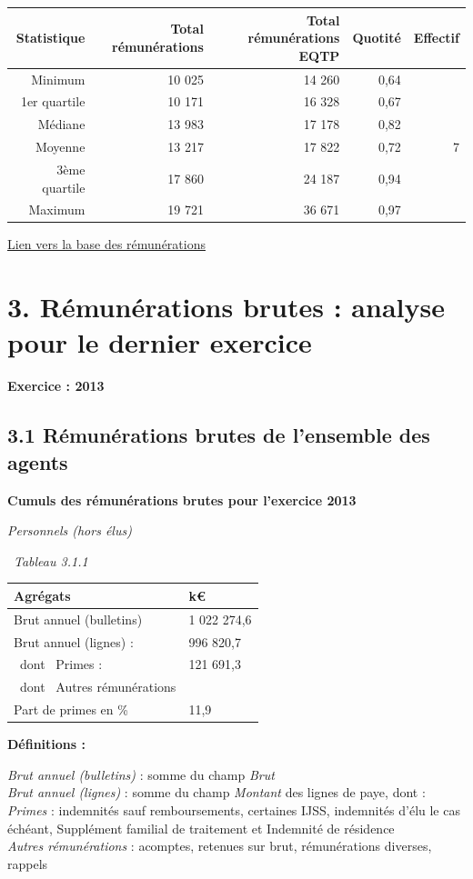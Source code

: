 \begin{longtable}[]{@{}rrrrr@{}}
\toprule
Statistique & Total rémunérations & Total rémunérations EQTP & Quotité &
Effectif\tabularnewline
\midrule
\endhead
Minimum & 10 025 & 14 260 & 0,64 &\tabularnewline
1er quartile & 10 171 & 16 328 & 0,67 &\tabularnewline
Médiane & 13 983 & 17 178 & 0,82 &\tabularnewline
Moyenne & 13 217 & 17 822 & 0,72 & 7\tabularnewline
3ème quartile & 17 860 & 24 187 & 0,94 &\tabularnewline
Maximum & 19 721 & 36 671 & 0,97 &\tabularnewline
\bottomrule
\end{longtable}

\href{../Bases/Remunerations/Analyse.remunerations.csv}{Lien vers la base
des rémunérations}

\newpage

\hypertarget{remunerations-brutes-analyse-pour-le-dernier-exercice}{%
\section{3. Rémunérations brutes : analyse pour le dernier
exercice}\label{remunerations-brutes-analyse-pour-le-dernier-exercice}}

\textbf{Exercice : 2013 }

\hypertarget{remunerations-brutes-de-lensemble-des-agents-1}{%
\subsection{3.1 Rémunérations brutes de l'ensemble des
agents}\label{remunerations-brutes-de-lensemble-des-agents-1}}

\textbf{Cumuls des rémunérations brutes pour l'exercice 2013 }

\emph{Personnels (hors élus)}

~\emph{Tableau 3.1.1}

\begin{longtable}[]{@{}ll@{}}
\toprule
Agrégats & k€\tabularnewline
\midrule
\endhead
Brut annuel (bulletins) & 1 022 274,6\tabularnewline
Brut annuel (lignes) : & 996 820,7\tabularnewline
~dont ~Primes : & 121 691,3\tabularnewline
~dont ~Autres rémunérations &\tabularnewline
Part de primes en \% & 11,9\tabularnewline
\bottomrule
\end{longtable}

\textbf{Définitions :}

\emph{Brut annuel (bulletins)} : somme du champ \emph{Brut}\\
\emph{Brut annuel (lignes)} : somme du champ \emph{Montant} des lignes
de paye, dont :\\
\emph{Primes} : indemnités sauf remboursements, certaines IJSS,
indemnités d'élu le cas échéant, Supplément familial de traitement et
Indemnité de résidence\\
\emph{Autres rémunérations} : acomptes, retenues sur brut, rémunérations
diverses, rappels

